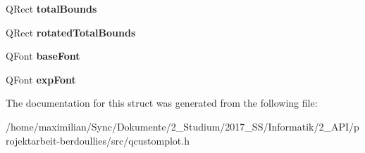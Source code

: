 \begin{DoxyCompactItemize}
Q\+Rect {\bfseries total\+Bounds}
\item 
\mbox{\label{struct_q_c_p_axis_painter_private_1_1_tick_label_data_aa4d38c5ea47c9184a78ee33ae7f1012e}} 
Q\+Rect {\bfseries rotated\+Total\+Bounds}
\item 
\mbox{\label{struct_q_c_p_axis_painter_private_1_1_tick_label_data_a0d4958a706debaa8d19a9b65fc090d56}} 
Q\+Font {\bfseries base\+Font}
\item 
\mbox{\label{struct_q_c_p_axis_painter_private_1_1_tick_label_data_adc10767ebcb719d6927c012a38b9d933}} 
Q\+Font {\bfseries exp\+Font}
\end{DoxyCompactItemize}


The documentation for this struct was generated from the following file\+:\begin{DoxyCompactItemize}
\item 
/home/maximilian/\+Sync/\+Dokumente/2\+\_\+\+Studium/2017\+\_\+\+S\+S/\+Informatik/2\+\_\+\+A\+P\+I/projektarbeit-\/berdoullies/src/qcustomplot.\+h\end{DoxyCompactItemize}

